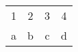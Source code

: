 \documentclass{article}
\begin{document}
\begin{tabular}{ | c | c | c | c | }
	1 & 2 & 3 & 4\\
	a & b & c & d
\end{tabular}
\end{document}
